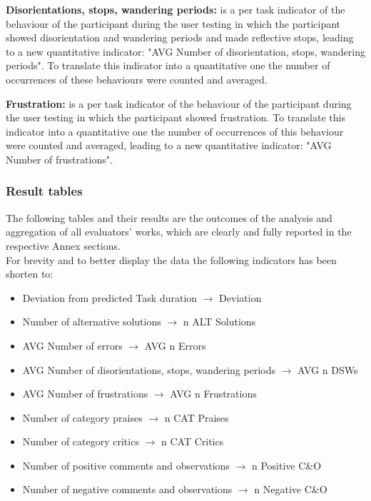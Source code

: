 \vspace{0.25cm}

\textbf{Disorientations, stops, wandering periods:} is a per task indicator of the behaviour of the participant during the user testing in which the participant showed disorientation and wandering periods and made reflective stops, leading to a new quantitative indicator: "AVG Number of disorientation, stops, wandering periods". To translate this indicator into a quantitative one the number of occurrences of these behaviours were counted  and averaged.

\vspace{0.25cm}

\textbf{Frustration:} is a per task indicator of the behaviour of the participant during the user testing in which the participant showed frustration. To translate this indicator into a quantitative one the number of occurrences of this behaviour were counted and averaged, leading to a new quantitative indicator: "AVG Number of frustrations".

\newpage

\subsubsection*{Result tables}
The following tables and their results are the outcomes of the analysis and aggregation of all evaluators' works, which are clearly and fully reported in the respective Annex sections.\\
For brevity and to better display the data the following indicators has been shorten to:
\begin{itemize}
	\item Deviation from predicted Task duration $\rightarrow$ Deviation
	\item Number of alternative solutions $\rightarrow$ n ALT Solutions
	\item AVG Number of errors $\rightarrow$ AVG n Errors
	\item AVG Number of disorientations, stops, wandering periods $\rightarrow$ AVG n DSWs
	\item AVG Number of frustrations $\rightarrow$ AVG n Frustrations
	\item Number of category praises $\rightarrow$ n CAT Praises
	\item Number of category critics $\rightarrow$ n CAT Critics
	\item Number of positive comments and observations $\rightarrow$ n Positive C\&O
	\item Number of negative comments and observations $\rightarrow$ n Negative C\&O
\end{itemize}

